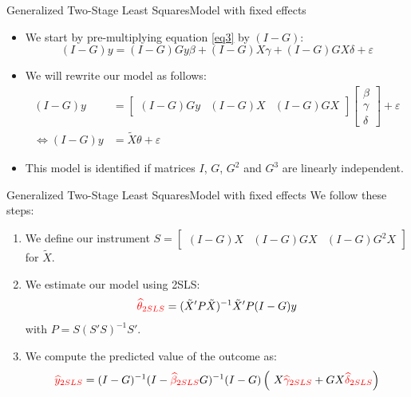\documentclass[aspectratio=169]{beamer}
\begin{document}
\begin{frame}{Generalized Two-Stage Least Squares}{Model with fixed effects} \label{fe_details}
\begin{itemize}
\item We start by pre-multiplying equation \eqref{eq3} by $(I-G)$:
$$(I-G) y = (I-G) {G} y \beta + (I-G) X \gamma  + (I-G) {G} X \delta + \varepsilon$$
\item We will rewrite our model as follows:
\begin{align*}
(I-G) y & = \begin{bmatrix} (I-G) Gy & (I-G) X & (I-G) GX \end{bmatrix} \begin{bmatrix} \beta \\ \gamma \\ \delta  \end{bmatrix} + \varepsilon \\
\Leftrightarrow (I-G) y & = \tilde{X} \theta + \varepsilon
\end{align*}
\item This model is identified if matrices $I$, $G$, $G^2$ and $G^3$ are linearly independent.
\end{itemize}
\end{frame}

\begin{frame}{Generalized Two-Stage Least Squares}{Model with fixed effects}
We follow these steps:
\begin{enumerate}
\item We define our instrument $ S = \begin{bmatrix} (I-G) X & (I-G) GX & (I-G) G^2X \end{bmatrix} $ for $\tilde{X}$.
\item We estimate our model using 2SLS: 
$$\textcolor{red}{\hat{\theta}_{2SLS}}= (\tilde{X}' P \tilde{X})^{-1} \tilde{X}' P (I-G) y  $$
with $P=S (S'S)^{-1} S'$.
\item We compute the predicted value of the outcome as:
$$ \textcolor{red}{\hat{y}_{2SLS}} = (I-G)^{-1}(I- \textcolor{red}{\hat{\beta}_{2SLS}} G)^{-1} (I-G) \left(\ X \textcolor{red}{\hat{\gamma}_{2SLS}}  +  G X \textcolor{red}{\hat{\delta}_{2SLS}}  \right) $$
\end{enumerate}
\end{frame}
\end{document}

